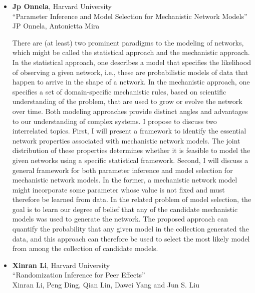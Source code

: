 \begin{itemize}
\item \textbf{Jp Onnela}, Harvard University \\
``Parameter Inference and Model Selection for Mechanistic Network Models'' \\
JP Onnela, Antonietta Mira


There are (at least) two prominent paradigms to the modeling of networks, which might be called the statistical approach and the mechanistic approach. In the statistical approach, one describes a model that specifies the likelihood of observing a given network, i.e., these are probabilistic models of data that happen to arrive in the shape of a network. In the mechanistic approach, one specifies a set of domain-specific mechanistic rules, based on scientific understanding of the problem, that are used to grow or evolve the network over time. Both modeling approaches provide distinct angles and advantages to our understanding of complex systems. I propose to discuss two interrelated topics. First, I will present a framework to identify the essential network properties associated with mechanistic network models. The joint distribution of these properties determines whether it is feasible to model the given networks using a specific statistical framework. Second, I will discuss a general framework for both parameter inference and model selection for mechanistic network models. In the former, a mechanistic network model might incorporate some parameter whose value is not fixed and must therefore be learned from data. In the related problem of model selection, the goal is to learn our degree of belief that any of the candidate mechanistic models was used to generate the network. The proposed approach can quantify the probability that any given model in the collection generated the data, and this approach can therefore be used to select the most likely model from among the collection of candidate models.

\item \textbf{Xinran Li}, Harvard University \\
``Randomization Inference for Peer Effects'' \\
Xinran Li, Peng Ding, Qian Lin, Dawei Yang and Jun S. Liu



\end{itemize}
